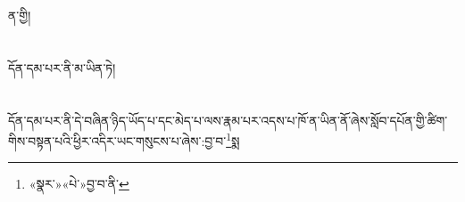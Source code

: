 ན་གྱི།\chapter{ }དོན་དམ་པར་ནི་མ་ཡིན་ཏེ།\chapter{ }དོན་དམ་པར་ནི་དེ་བཞིན་ཉིད་ཡོད་པ་དང་མེད་པ་ལས་རྣམ་པར་འདས་པ་ཁོ་ན་ཡིན་ནོ་ཞེས་སློབ་དཔོན་གྱི་ཚིག་གིས་བསྟན་པའི་ཕྱིར་འདིར་ཡང་གསུངས་པ་ཞེས་:བྱ་བ་\footnote{«སྣར་»«པེ་»བྱ་བ་ནི་}སྨ